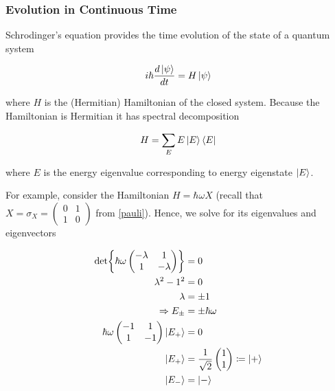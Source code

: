\documentclass[main.tex]{subfiles}
\begin{document}
\begin{subappendices}
\begin{exercise}
\end{exercise}

\subsubsection{Evolution in Continuous Time}\label{post-cts-evol}

Schrodinger's equation provides the time evolution of the state of a quantum system

\begin{align}\label{schro-cts}
i\hbar \frac{d\ket{\psi}}{dt} = H\ket{\psi}	
\end{align}

where $H$ is the (Hermitian) Hamiltonian of the closed system. Because the Hamiltonian is Hermitian it has spectral decomposition 

\begin{align*}
H = \sum_{E} E \ket{E}\bra{E}	
\end{align*}

where $E$ is the energy eigenvalue corresponding to energy eigenstate $\ket{E}$. 

For example, consider the Hamiltonian $H = \hbar \omega X$  (recall that $X = \sigma_X = \begin{pmatrix} 0 & 1 \\ 1 & 0\end{pmatrix}$ from \ref{pauli}). Hence, we solve for its eigenvalues and eigenvectors

\begin{align*}
	\det{ \hbar\omega\begin{pmatrix} -\lambda & 1 \\ 1 & -\lambda\end{pmatrix}} &= 0 \\
	\lambda^2 - 1^2 &= 0 \\
	\lambda &= \pm 1 \\
	\Rightarrow E_{\pm} &= \pm \hbar \omega \\
	\hbar\omega\begin{pmatrix} -1 & 1 \\ 1 & -1\end{pmatrix}\ket{E_+} &= 0 \\
	\ket{E_+} &= \frac{1}{\sqrt{2}}\begin{pmatrix}
		1 \\ 1
	\end{pmatrix} \coloneqq \ket{+} \\
	\ket{E_-} &= \ket{-}
\end{align*}


\end{subappendices}
\end{document}
